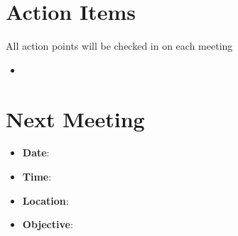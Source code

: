 \documentclass{article}
\begin{document}
\section*{Action Items}
All action points will be checked in on each meeting

\begin{itemize}
    \item 
\end{itemize}


\section*{Next Meeting}

\begin{itemize}
    \item \textbf{Date}: 
    \item \textbf{Time}:
    \item \textbf{Location}:
    \item \textbf{Objective}:
\end{itemize}
\end{document}
